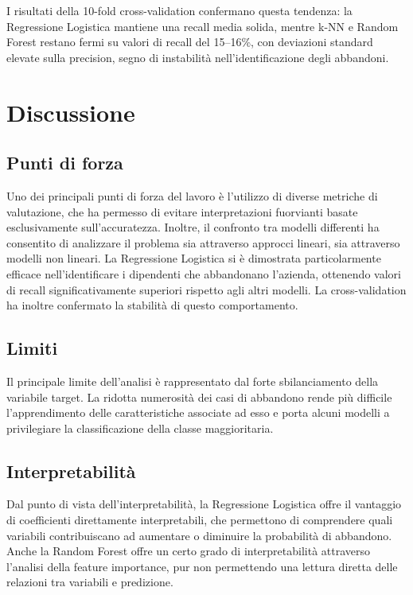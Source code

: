 \documentclass[11pt,a4paper]{article}
\begin{document}
I risultati della 10-fold cross-validation confermano questa tendenza: la Regressione Logistica mantiene una recall media solida, mentre k-NN e Random Forest restano fermi su valori di recall del 15--16\%, con deviazioni standard elevate sulla precision, segno di instabilit\`{a} nell'identificazione degli abbandoni.


\section{Discussione}
\label{sec:discussione}

\subsection{Punti di forza}

Uno dei principali punti di forza del lavoro \`{e} l'utilizzo di diverse metriche di valutazione, che ha permesso di evitare interpretazioni fuorvianti basate esclusivamente sull'accuratezza. Inoltre, il confronto tra modelli differenti ha consentito di analizzare il problema sia attraverso approcci lineari, sia attraverso modelli non lineari. La Regressione Logistica si \`{e} dimostrata particolarmente efficace nell'identificare i dipendenti che abbandonano l'azienda, ottenendo valori di recall significativamente superiori rispetto agli altri modelli. La cross-validation ha inoltre confermato la stabilit\`{a} di questo comportamento.

\subsection{Limiti}

Il principale limite dell'analisi \`{e} rappresentato dal forte sbilanciamento della variabile target. La ridotta numerosit\`{a} dei casi di abbandono rende pi\`{u} difficile l'apprendimento delle caratteristiche associate ad esso e porta alcuni modelli a privilegiare la classificazione della classe maggioritaria.

\subsection{Interpretabilit\`{a}}

Dal punto di vista dell'interpretabilit\`{a}, la Regressione Logistica offre il vantaggio di coefficienti direttamente interpretabili, che permettono di comprendere quali variabili contribuiscano ad aumentare o diminuire la probabilit\`{a} di abbandono. Anche la Random Forest offre un certo grado di interpretabilit\`{a} attraverso l'analisi della feature importance, pur non permettendo una lettura diretta delle relazioni tra variabili e predizione.
\end{document}
